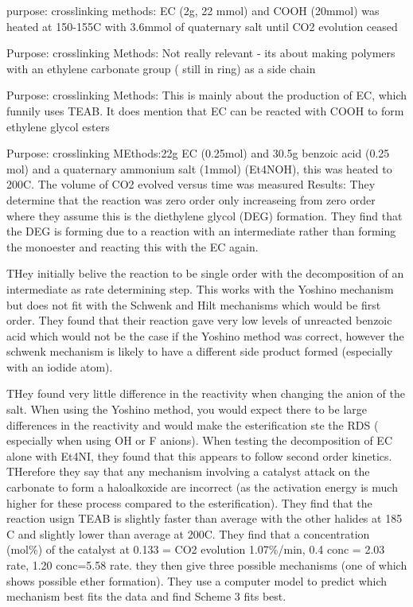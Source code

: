 \cite{pawlowski1991etch}


\cite{yoshino1977synthetic}
purpose: crosslinking
methods: EC (2g, 22 mmol) and COOH (20mmol) was heated at 150-155C with 3.6mmol of quaternary salt until CO2 evolution ceased


\cite{gordon1972pyrolysis}

\cite{webster2003cyclic}
Purpose: crosslinking
Methods: Not really relevant - its about making polymers with an ethylene carbonate group ( still in ring) as a side chain

\cite{peppel1958preparation}
Purpose: crosslinking
Methods: This is mainly about the production of EC, which funnily uses TEAB. It does mention that EC can be reacted with COOH to form ethylene glycol esters



\cite{fagerburg1984reaction}
Purpose: crosslinking
MEthods:22g EC (0.25mol) and 30.5g benzoic acid (0.25 mol) and a quaternary ammonium salt (1mmol) (Et4NOH), this was heated to 200C. The volume of CO2 evolved versus time was measured
Results: They determine that the reaction was zero order only increaseing from zero order where they assume this is the diethylene glycol (DEG) formation. They find that the DEG is forming due to a reaction with an intermediate rather than forming the monoester and reacting this with the EC again.

THey initially belive the reaction to be single order with the decomposition of an intermediate as rate determining step. This works with the Yoshino \cite{yoshino1977synthetic} mechanism but does not fit with the Schwenk and Hilt mechanisms which would be first order. They found that their reaction gave very low levels of unreacted benzoic acid which would not be the case if the Yoshino method was correct, however the schwenk mechanism is likely to have a different side product formed (especially with an iodide atom). 

THey found very little difference in the reactivity when changing the anion of the salt. When using the Yoshino method, you would expect there to be large differences in the reactivity and would make the esterification ste the RDS ( especially when using OH or F anions). When testing the decomposition of EC alone with Et4NI, they found that this appears to follow second order kinetics. THerefore they say that any mechanism involving a catalyst attack on the carbonate to form a haloalkoxide are incorrect (as the activation energy is much higher for these process compared to the esterification). They find that the reaction usign TEAB is slightly faster than average with the other halides at 185 C and slightly lower than average at 200C. They find that a concentration (mol\%) of the catalyst at 0.133 = CO2 evolution 1.07\%/min, 0.4 conc = 2.03 rate, 1.20 conc=5.58 rate. they then give three possible mechanisms (one of which shows possible ether formation). They use a computer model to predict which mechanism best fits the data and find Scheme 3 fits best.

